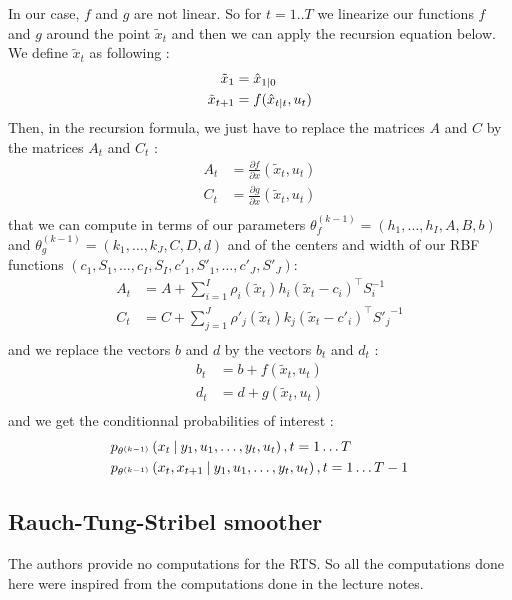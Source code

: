 In our case, $f$ and $g$ are not linear.
So for $t=1..T$ we linearize our functions $f$ and $g$ around the point $\tilde{x}_t$ and then we can apply the recursion equation below.
We define $\tilde{x}_t$ as following :
\begin{align*}
  \tilde{x}_1 &= \hat{x}_{1 \mathbin{\vert} 0}\\
  \tilde{x}_{t+1} &= f(\hat{x}_{t \mathbin{\vert} t}, u_t)\\
\end{align*}
Then, in the recursion formula, we just have  to replace the matrices $A$ and $C$  by the matrices $A_t$ and $C_t$ :
\begin{align*}
  A_t &= \frac{\partial f}{\partial x}(\tilde{x}_t, u_t)\\
  C_t &= \frac{\partial g}{\partial x}(\tilde{x}_t, u_t)\\
\end{align*}
that we can compute in terms of our parameters $\theta_f^{(k-1)} = \left( h_1, \ldots , h_I, A, B, b \right)$ and $\theta_g^{(k-1)} = \left( k_1, \ldots , k_J, C, D, d \right)$ and of the centers and width of our RBF functions $(c_1, S_1, \ldots ,c_I, S_I, c'_1, S'_1, \ldots , c'_J, S'_J)$:
\begin{align*}
  A_t &= A + \sum_{i=1}^I \rho_i(\tilde{x}_t) h_i (\tilde{x}_t - c_i)^{\top} S_i^{-1}\\
  C_t &= C + \sum_{j=1}^J \rho'_j(\tilde{x}_t) k_j (\tilde{x}_t - c'_i)^{\top} {S'_j}^{-1}\\
\end{align*}
and we replace the vectors $b$ and $d$ by the vectors $b_t$ and $d_t$ :
\begin{align*}
  b_t &= b + f(\tilde{x}_t, u_t)\\
  d_t &= d + g(\tilde{x}_t, u_t)\\
\end{align*}
and we get the conditionnal probabilities of interest :
\begin{align*}
  &p_{\theta^{(k-1)}}\left(x_t \mathbin{\vert} y_1, u_1, \ldots, y_t, u_t \right), t=1 \ldots T\\
  &p_{\theta^{(k-1)}}\left(x_t, x_{t+1} \mathbin{\vert} y_1, u_1, \ldots, y_t, u_t \right), t=1 \ldots T-1\\
\end{align*}

\subsection{Rauch-Tung-Stribel smoother}
The authors provide no computations for the RTS.
So all the computations done here were inspired from the computations done in the lecture notes.

